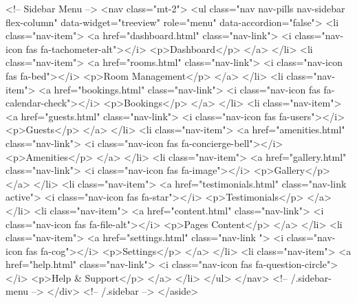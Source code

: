             <!-- Sidebar Menu -->
            <nav class="mt-2">
                <ul class="nav nav-pills nav-sidebar flex-column" data-widget="treeview" role="menu" data-accordion="false">
                    <li class="nav-item">
                        <a href="dashboard.html" class="nav-link">
                            <i class="nav-icon fas fa-tachometer-alt"></i>
                            <p>Dashboard</p>
                        </a>
                    </li>
                    <li class="nav-item">
                        <a href="rooms.html" class="nav-link">
                            <i class="nav-icon fas fa-bed"></i>
                            <p>Room Management</p>
                        </a>
                    </li>
                    <li class="nav-item">
                        <a href="bookings.html" class="nav-link">
                            <i class="nav-icon fas fa-calendar-check"></i>
                            <p>Bookings</p>
                        </a>
                    </li>
                    <li class="nav-item">
                        <a href="guests.html" class="nav-link">
                            <i class="nav-icon fas fa-users"></i>
                            <p>Guests</p>
                        </a>
                    </li>
                    <li class="nav-item">
                        <a href="amenities.html" class="nav-link">
                            <i class="nav-icon fas fa-concierge-bell"></i>
                            <p>Amenities</p>
                        </a>
                    </li>
                    <li class="nav-item">
                        <a href="gallery.html" class="nav-link">
                            <i class="nav-icon fas fa-image"></i>
                            <p>Gallery</p>
                        </a>
                    </li>
                    <li class="nav-item">
                        <a href="testimonials.html" class="nav-link active">
                            <i class="nav-icon fas fa-star"></i>
                            <p>Testimonials</p>
                        </a>
                    </li>
                    <li class="nav-item">
                        <a href="content.html" class="nav-link">
                            <i class="nav-icon fas fa-file-alt"></i>
                            <p>Pages Content</p>
                        </a>
                    </li>
                    <li class="nav-item">
                        <a href="settings.html" class="nav-link ">
                            <i class="nav-icon fas fa-cog"></i>
                            <p>Settings</p>
                        </a>
                    </li>
                    <li class="nav-item">
                        <a href="help.html" class="nav-link">
                            <i class="nav-icon fas fa-question-circle"></i>
                            <p>Help & Support</p>
                        </a>
                    </li>
                </ul>
            </nav>
            <!-- /.sidebar-menu -->
        </div>
        <!-- /.sidebar -->
    </aside>

